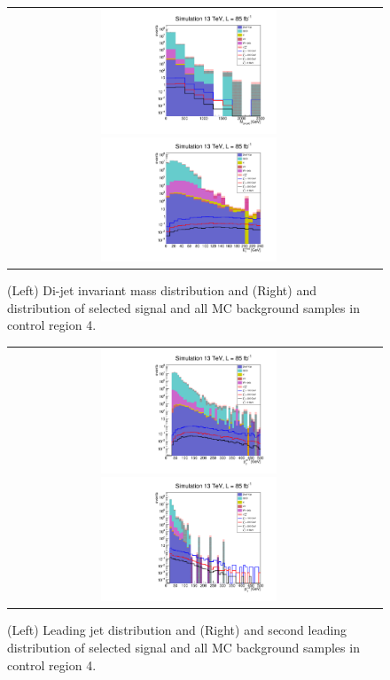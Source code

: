 \begin{figure}[tbh!]
	\centering
	\begin{tabular}{cc}
		\includegraphics[width=0.5\textwidth]{analysis/pics/h_dijetinvariantmass_Tau2LooseIsoInclusiveVBFInverted.pdf}
		\includegraphics[width=0.5\textwidth]{analysis/pics/h_met_Tau2LooseIsoInclusiveVBFInverted.pdf}
	\end{tabular}
	\caption{(Left) Di-jet invariant mass distribution and (Right) and \met distribution of selected signal and all MC background samples in control region 4.}
	\label{fig::crplots1_Tau2LooseIsoInclusiveVBFInverted_13tev}
\end{figure}

\begin{figure}[tbh!]
	\centering
	\begin{tabular}{cc}
		\includegraphics[width=0.5\textwidth]{analysis/pics/h_jet1pt_Tau2LooseIsoInclusiveVBFInverted.pdf}
		\includegraphics[width=0.5\textwidth]{analysis/pics/h_tau2pt_Tau2LooseIsoInclusiveVBFInverted.pdf}
	\end{tabular}
	\caption{(Left) Leading jet \pt distribution and (Right) and second leading \hadtau \pt distribution of selected signal and all MC background samples in control region 4.}
	\label{fig::crplots2_Tau2LooseIsoInclusiveVBFInverted_13tev}
\end{figure}

